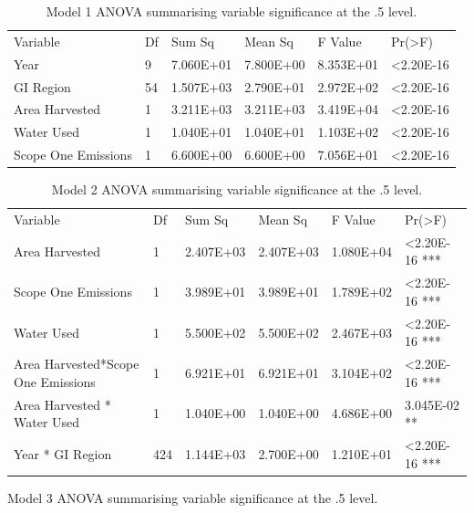\documentclass[review,12pt,authoryear]{elsarticle}
\begin{document}
\begin{linenumbers}
%
\begin{table}[]
  \label{tab:tab6}
  \caption{Model 1 ANOVA summarising variable significance at the .5 level.}
  \begin{tabular}{llllll}
  Variable       & Df & Sum Sq    & Mean Sq   & F Value   & Pr(\textgreater{}F) \\
  Year                & 9  & 7.060E+01 & 7.800E+00 & 8.353E+01 & \textless 2.20E-16 \\
  GI Region           & 54 & 1.507E+03 & 2.790E+01 & 2.972E+02 & \textless 2.20E-16 \\
  Area Harvested      & 1  & 3.211E+03 & 3.211E+03 & 3.419E+04 & \textless 2.20E-16 \\
  Water Used          & 1  & 1.040E+01 & 1.040E+01 & 1.103E+02 & \textless 2.20E-16 \\
  Scope One Emissions & 1  & 6.600E+00 & 6.600E+00 & 7.056E+01 & \textless 2.20E-16
  \end{tabular}
\end{table}
\begin{table}[]
  \label{tab:tab7}
  \caption{Model 2 ANOVA summarising variable significance at the .5 level.}
  \begin{tabular}{llllll}
  Variable                    & Df  & Sum Sq    & Mean Sq   & F Value   & Pr(\textgreater{}F)    \\
  Area Harvested              & 1   & 2.407E+03 & 2.407E+03 & 1.080E+04 & \textless 2.20E-16 *** \\
  Scope One Emissions         & 1   & 3.989E+01 & 3.989E+01 & 1.789E+02 & \textless 2.20E-16 *** \\
  Water Used                  & 1   & 5.500E+02 & 5.500E+02 & 2.467E+03 & \textless 2.20E-16 *** \\
  Area Harvested*Scope One Emissions & 1 & 6.921E+01 & 6.921E+01 & 3.104E+02 & \textless 2.20E-16 *** \\
  Area Harvested * Water Used & 1   & 1.040E+00 & 1.040E+00 & 4.686E+00 & 3.045E-02 **           \\
  Year * GI Region            & 424 & 1.144E+03 & 2.700E+00 & 1.210E+01 & \textless 2.20E-16 ***
  \end{tabular}
\end{table}
%
\begin{table}[]
  \caption{Model 3 ANOVA summarising variable significance at the .5 level.}

\end{table}
\end{linenumbers}
\end{document}
